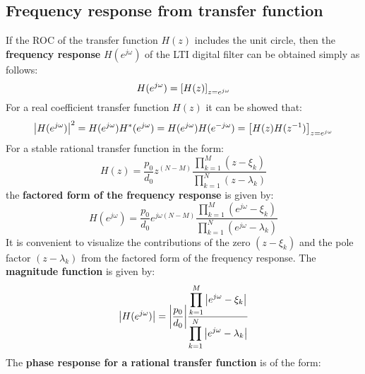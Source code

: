 \documentclass[../../main/main.tex]{subfiles}
\begin{document}

\subsection{Frequency response from transfer function}
If the ROC of the transfer function \( H(z) \) includes the unit circle, then the \textbf{frequency response} \( H(e^{j\omega}) \) of the LTI digital filter can be obtained simply as follows:
\begin{equation}
    H(e^{j\omega})
    =
    \qty[H(z)]_{z=e^{j\omega}}
    \label{eq:L19_S03_1}
\end{equation}
For a real coefficient transfer function \( H(z) \) it can be showed that:
\begin{equation}
    \abs{H(e^{j\omega})}^2
    =
    H(e^{j\omega}) H^{*}(e^{j\omega})
    =
    H(e^{j\omega}) H(e^{-j\omega})
    =
    \qty[H(z)H(z^{-1})]_{z=e^{j\omega}}
    \label{eq:L19_S03_2}
\end{equation}
For a stable rational transfer function in the form:
\begin{equation}
    H(z)
    =
    \frac{p_{0}}{d_{0}} z^{(N-M)} \frac{\displaystyle \prod_{k=1}^{M} (z-\xi_{k})}{\displaystyle \prod_{k=1}^{N} (z-\lambda_{k})}
    \label{eq:L19_S04_1}
\end{equation}
the \textbf{factored form of the frequency response} is given by:
\begin{equation}
    H(e^{j\omega})
    =
    \frac{p_{0}}{d_{0}} e^{j\omega (N-M)} \frac{\displaystyle \prod_{k=1}^{M} (e^{j\omega}-\xi_{k})}{\displaystyle \prod_{k=1}^{N} (e^{j\omega}-\lambda_{k})}
    \label{eq:L19_S04_2}
\end{equation}
It is convenient to visualize the contributions of the zero \( (z-\xi_{k}) \) and the pole factor \( (z-\lambda_{k}) \) from the factored form of the frequency response. The \textbf{magnitude function} is given by:
\begin{equation}
    \abs{H(e^{j\omega})}
    =
    \abs{\frac{p_{0}}{d_{0}}}
    \frac{\displaystyle \prod_{k=1}^{M} \abs{e^{j\omega}-\xi_{k}}}{\displaystyle \prod_{k=1}^{N} \abs{e^{j\omega}-\lambda_{k}}}
    \label{eq:L19_S05_1}
\end{equation}
The \textbf{phase response for a rational transfer function} is of the form:
\end{document}
